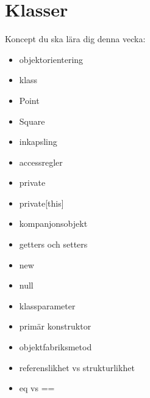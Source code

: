 \chapter{Klasser}\label{chapter:W06}
Koncept du ska lära dig denna vecka:
\begin{multicols}{2}\begin{itemize}[nosep,label={$\square$},leftmargin=*]
\item objektorientering
\item klass
\item Point
\item Square
\item inkapsling
\item accessregler
\item private
\item private[this]
\item kompanjonsobjekt
\item getters och setters
\item new
\item null
\item klassparameter
\item primär konstruktor
\item objektfabriksmetod
\item referenslikhet vs strukturlikhet
\item eq vs ==\end{itemize}\end{multicols}

